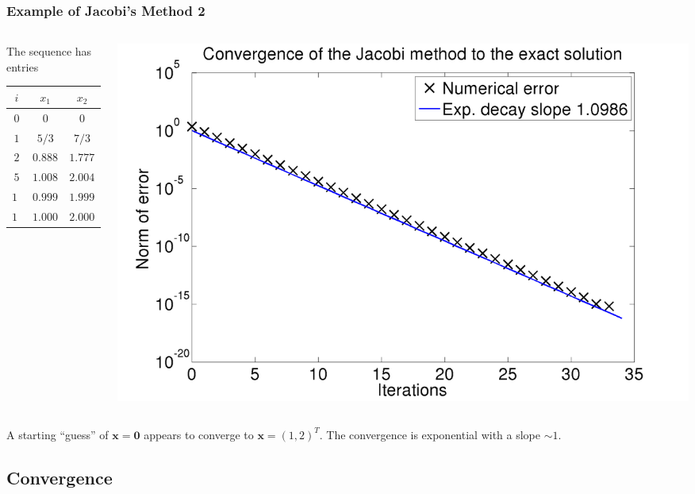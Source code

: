 \documentclass{beamer}
\newcommand{\bx}{{\boldsymbol{x}}}
\newcommand{\bfm}[1]{{\boldsymbol{#1}}}
\begin{document}
\begin{frame}
  \frametitle{Example of Jacobi's Method 2}

  \begin{columns}
    \begin{column}{0.475\textwidth}
      The sequence has entries
      \begin{tabular}{|c|c c|}
        $i$ & $x_1$ & $x_2$ \\ \hline
        $0$ & $0$ & $0$ \\
        $1$ & $5 / 3$ & $7 / 3$ \\
        $2$ & $0.888889$ & $1.777778$ \\
        $5$ & $1.008230$ & $2.004115$ \\
        $10$ & $0.999983$ & $1.999966$ \\
        $100$ & $1.000000$ & $2.000000$
      \end{tabular}
    \end{column}
    \begin{column}{0.525\textwidth}
      \begin{center}
        \includegraphics[width=\textwidth]{figures/Jacobi1}
      \end{center}
    \end{column}
  \end{columns}

  \vspace{1ex}

  A starting ``guess'' of $\bx = \bfm{0}$ appears to converge to $\bx
  = (1, 2)^T$. The convergence is exponential with a slope $\sim 1$.

\end{frame}


\subsection{Convergence}
\end{document}
